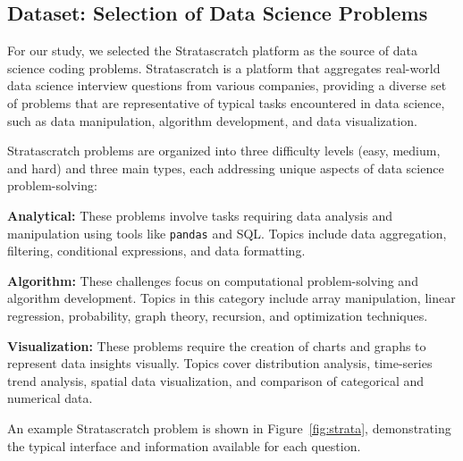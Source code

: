 \documentclass[conference]{IEEEtran}
\begin{document}

\subsection{Dataset: Selection of Data Science Problems} \label{sub:dataset}

For our study, we selected the Stratascratch \cite{stratascratch_master_coding} platform as the source of data science coding problems. Stratascratch is a platform that aggregates real-world data science interview questions from various companies, providing a diverse set of problems that are representative of typical tasks encountered in data science, such as data manipulation, algorithm development, and data visualization. 

Stratascratch problems are organized into three difficulty levels (easy, medium, and hard) and three main types, each addressing unique aspects of data science problem-solving:

\textbf{Analytical:} These problems involve tasks requiring data analysis and manipulation using tools like \texttt{pandas} and SQL. Topics include data aggregation, filtering, conditional expressions, and data formatting. 

\textbf{Algorithm:} These challenges focus on computational problem-solving and algorithm development. Topics in this category include array manipulation, linear regression, probability, graph theory, recursion, and optimization techniques. 

\textbf{Visualization:} These problems require the creation of charts and graphs to represent data insights visually. Topics cover distribution analysis, time-series trend analysis, spatial data visualization, and comparison of categorical and numerical data. 

An example Stratascratch problem is shown in Figure~\ref{fig:strata}, demonstrating the typical interface and information available for each question.
 
\end{document}
